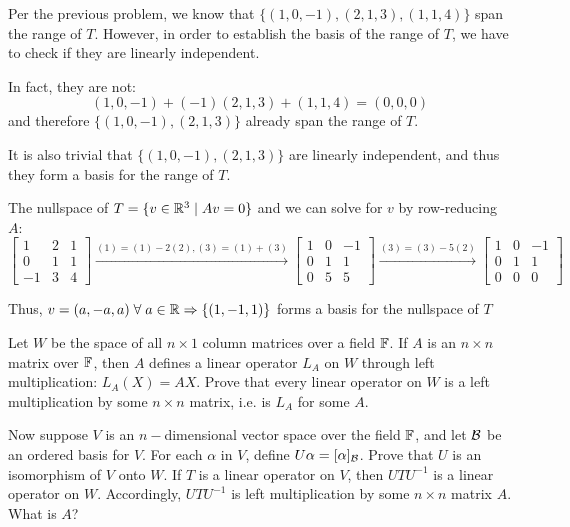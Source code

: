 \documentclass[a4paper, 11pt]{article}
\begin{document}
\begin{solution}
    Per the previous problem, we know that \(\{(1, 0, -1), (2, 1, 3), (1, 1, 4)\}\) span the range of \(T\). However, in order to establish the basis of the range of \(T\), we have to check if they are linearly independent.

    In fact, they are not:
    \[
        (1, 0, -1) + (-1)(2, 1, 3) + (1, 1, 4) = (0, 0, 0)
    \]
    and therefore \(\{(1, 0, -1), (2, 1, 3)\}\) already span the range of \(T\).

    It is also trivial that \(\{(1, 0, -1), (2, 1, 3)\}\) are linearly independent, and thus they form a basis for the range of \(T\).

    The nullspace of \(T = \{v \in \mathbb{R}^3 \mid Av = 0\}\) and we can solve for \(v\) by row-reducing \(A\):
    \[
        \left[\begin{array}{ccc}
                1  & 2 & 1 \\
                0  & 1 & 1 \\
                -1 & 3 & 4
            \end{array}\right] \xrightarrow{(1) = (1) - 2(2), (3) = (1) + (3)} \left[\begin{array}{ccc}
                1 & 0 & -1 \\
                0 & 1 & 1  \\
                0 & 5 & 5
            \end{array}\right] \xrightarrow{(3) = (3) - 5(2)} \left[\begin{array}{ccc}
                1 & 0 & -1 \\
                0 & 1 & 1  \\
                0 & 0 & 0
            \end{array}\right]
    \]

    Thus, \(v = (a, -a, a) \forall a \in \bbr \implies \{(1, -1, 1)\}\) forms a basis for the nullspace of \(T\)
\end{solution}
\begin{problem} 
Let \(W\) be the space of all \(n \times 1\) column matrices over a field \(\mathbb{F}\). If \(A\) is an \(n \times n\) matrix over \(\mathbb{F}\), then \(A\) defines a linear operator \(L_A\) on \(W\) through left multiplication: \(L_A(X) = AX\). Prove that every linear operator on \(W\) is a left multiplication by some \(n \times n \) matrix, i.e. is \(L_A\) for some \(A\).

Now suppose \(V\) is an \(n-\)dimensional vector space over the field \(\mathbb{F}\), and let \(\mathcal{B}\) be an ordered basis for \(V\). For each \(\alpha\) in \(V\), define \(U\alpha = [\alpha]_{\mathcal{B}}\). Prove that \(U\) is an isomorphism of \(V\) onto \(W\).
If \(T\) is a linear operator on \(V\), then \(UTU^{-1}\) is a linear operator on \(W\). Accordingly, \(UTU^{-1}\) is left multiplication by some \(n \times n\) matrix \(A\). What is \(A\)?
\end{problem}
\end{document}
